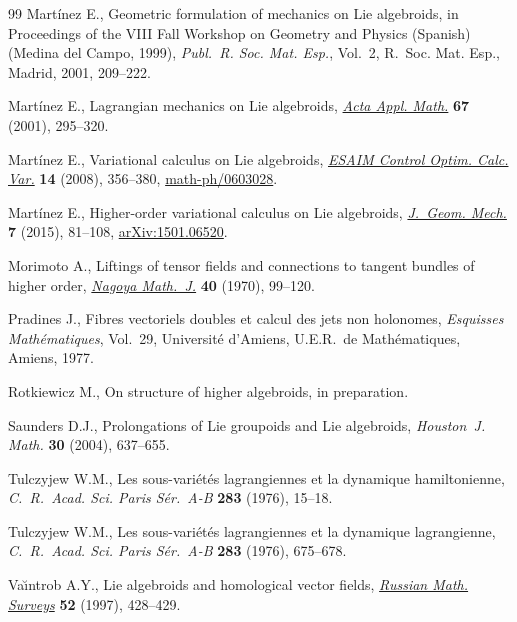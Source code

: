 \documentclass[pdftex]{sigma}
\numberwithin{equation}{section}
\theoremstyle{definition}
\begin{document}
\begin{thebibliography}{99}
Mart\'{i}nez E., Geometric formulation of mechanics on {L}ie algebroids, in
 Proceedings of the {VIII} {F}all {W}orkshop on {G}eometry and {P}hysics
 ({S}panish) ({M}edina del {C}ampo, 1999), \textit{Publ.~R. Soc. Mat. Esp.},
 Vol.~2, R.~Soc. Mat. Esp., Madrid, 2001, 209--222.

Mart\'{i}nez E., Lagrangian mechanics on {L}ie algebroids, \href{https://doi.org/10.1023/A:1011965919259}{\textit{Acta Appl.
 Math.}} \textbf{67} (2001), 295--320.

Mart\'{i}nez E., Variational calculus on {L}ie algebroids, \href{https://doi.org/10.1051/cocv:2007056}{\textit{ESAIM
 Control Optim. Calc. Var.}} \textbf{14} (2008), 356--380,
 \href{https://arxiv.org/abs/math-ph/0603028}{math-ph/0603028}.

Mart\'{i}nez E., Higher-order variational calculus on {L}ie algebroids,
 \href{https://doi.org/10.3934/jgm.2015.7.81}{\textit{J.~Geom. Mech.}} \textbf{7} (2015), 81--108, \href{https://arxiv.org/abs/1501.06520}{arXiv:1501.06520}.

Morimoto A., Liftings of tensor fields and connections to tangent bundles of
 higher order, \href{https://doi.org/10.1017/S002776300001388X}{\textit{Nagoya Math.~J.}} \textbf{40} (1970), 99--120.

Pradines J., Fibres vectoriels doubles et calcul des jets non holonomes,
 \textit{Esquisses Math\'{e}matiques}, Vol.~29,
 Universit\'{e} d'Amiens, U.E.R.~de Math\'{e}matiques, Amiens, 1977.

Rotkiewicz M., On structure of higher algebroids, {i}n preparation.

Saunders D.J., Prolongations of {L}ie groupoids and {L}ie algebroids,
 \textit{Houston~J. Math.} \textbf{30} (2004), 637--655.

Tulczyjew W.M., Les sous-vari\'{e}t\'{e}s lagrangiennes et la dynamique
 hamiltonienne, \textit{C.~R.~Acad. Sci. Paris S\'{e}r.~A-B} \textbf{283}
 (1976), 15--18.

Tulczyjew W.M., Les sous-vari\'{e}t\'{e}s lagrangiennes et la dynamique
 lagrangienne, \textit{C.~R.~Acad. Sci. Paris S\'{e}r.~A-B} \textbf{283}
 (1976), 675--678.

Va\u{\i}ntrob A.Y., Lie algebroids and homological vector fields,
 \href{https://doi.org/10.1070/RM1997v052n02ABEH001802}{\textit{Russian Math. Surveys}} \textbf{52} (1997), 428--429.


\end{thebibliography}
\end{document}
